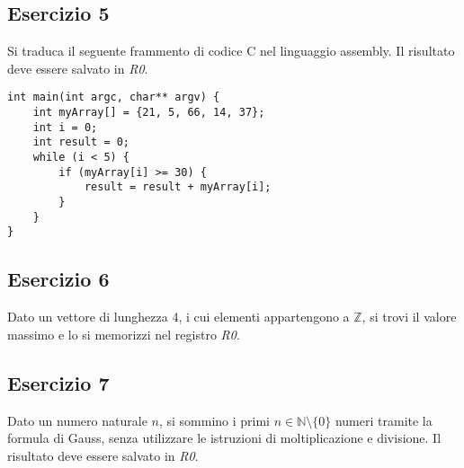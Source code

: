 \documentclass{article}
\begin{document}
\subsection*{Esercizio 5}
Si traduca il seguente frammento di codice C nel linguaggio assembly. Il risultato deve essere salvato in \textit{R0}.
\begin{lstlisting}
int main(int argc, char** argv) {
	int myArray[] = {21, 5, 66, 14, 37};
	int i = 0;
	int result = 0;
	while (i < 5) {
		if (myArray[i] >= 30) {
			result = result + myArray[i];
		}
	}
}
\end{lstlisting}

\subsection*{Esercizio 6}
Dato un vettore di lunghezza 4, i cui elementi appartengono a $\mathbb{Z}$, si trovi il valore massimo e lo si memorizzi nel registro \textit{R0}.

\subsection*{Esercizio 7}
Dato un numero naturale $n$, si sommino i primi $n \in \mathbb{N} \setminus \{0\}$ numeri tramite la formula di Gauss, senza utilizzare le istruzioni di moltiplicazione e divisione. Il risultato deve essere salvato in \textit{R0}.
\end{document}
